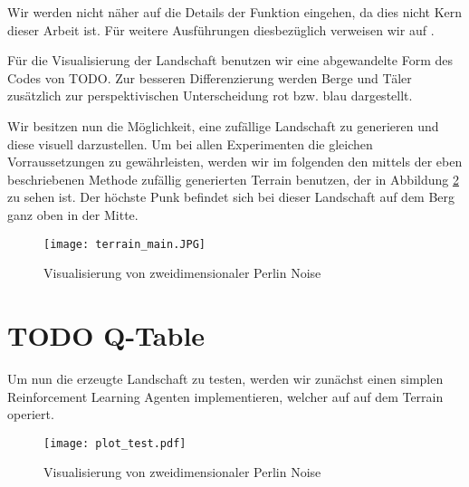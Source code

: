 Wir werden nicht näher auf die Details der Funktion eingehen, da dies nicht Kern dieser Arbeit ist. Für weitere Ausführungen diesbezüglich verweisen wir auf \cite{archer2011procedurally}.

Für die Visualisierung der Landschaft benutzen wir eine abgewandelte Form des Codes von TODO. Zur besseren Differenzierung werden Berge und Täler zusätzlich zur perspektivischen Unterscheidung rot bzw. blau dargestellt.

\smallspace

Wir besitzen nun die Möglichkeit, eine zufällige Landschaft zu generieren und diese visuell darzustellen. Um bei allen Experimenten die gleichen Vorraussetzungen zu gewährleisten, werden wir im folgenden den mittels der eben beschriebenen Methode zufällig generierten Terrain benutzen, der in Abbildung \ref{img:terrainMain} zu sehen ist. Der höchste Punk befindet sich bei dieser Landschaft auf dem Berg ganz oben in der Mitte.

\begin{figure}[h]
    \centering
    \texttt{[image: terrain\_main.JPG]}
    \caption{Visualisierung von zweidimensionaler Perlin Noise} \label{img:terrainMain}
\end{figure}

\section{TODO Q-Table}

Um nun die erzeugte Landschaft zu testen, werden wir zunächst einen simplen Reinforcement Learning Agenten implementieren, welcher auf auf dem Terrain operiert. 

\begin{figure}[h]
    \centering
    \texttt{[image: plot\_test.pdf]}
    \caption{Visualisierung von zweidimensionaler Perlin Noise} \label{img:terrainMain}
\end{figure}

\the\textwidth

% 
% 





      
